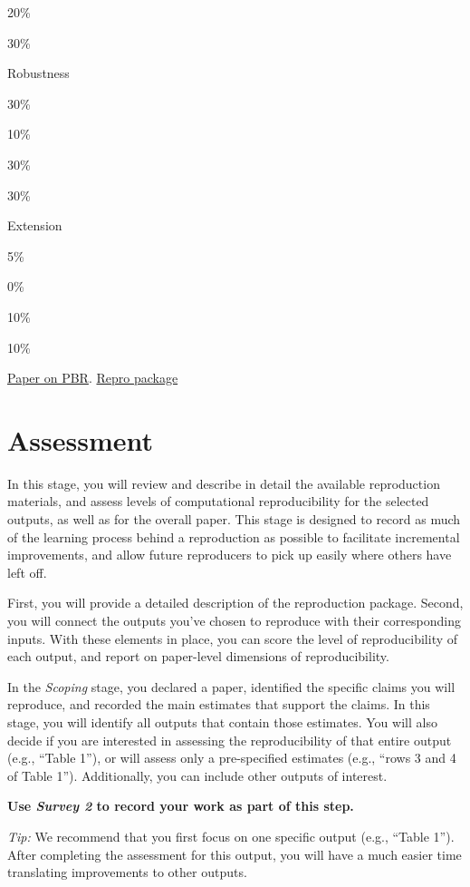 \documentclass[]{book}
\begin{document}
20\%

30\%

Robustness

30\%

10\%

30\%

30\%

Extension

5\%

0\%

10\%

10\%

\href{https://osf.io/4jvq2/download}{Paper on PBR}. \href{https://dataverse.harvard.edu/dataset.xhtml?persistentId=doi:10.7910/DVN/FPNITS}{Repro package}

\hypertarget{assessment}{%
\chapter{Assessment}\label{assessment}}

In this stage, you will review and describe in detail the available reproduction materials, and assess levels of computational reproducibility for the selected outputs, as well as for the overall paper. This stage is designed to record as much of the learning process behind a reproduction as possible to facilitate incremental improvements, and allow future reproducers to pick up easily where others have left off.

First, you will provide a detailed description of the reproduction package. Second, you will connect the outputs you've chosen to reproduce with their corresponding inputs. With these elements in place, you can score the level of reproducibility of each output, and report on paper-level dimensions of reproducibility.

In the \emph{Scoping} stage, you declared a paper, identified the specific claims you will reproduce, and recorded the main estimates that support the claims. In this stage, you will identify all outputs that contain those estimates. You will also decide if you are interested in assessing the reproducibility of that entire output (e.g., ``Table 1''), or will assess only a pre-specified estimates (e.g., ``rows 3 and 4 of Table 1''). Additionally, you can include other outputs of interest.

\textbf{Use \emph{Survey 2} to record your work as part of this step.}

\emph{Tip:} We recommend that you first focus on one specific output (e.g., ``Table 1''). After completing the assessment for this output, you will have a much easier time translating improvements to other outputs.
\end{document}
